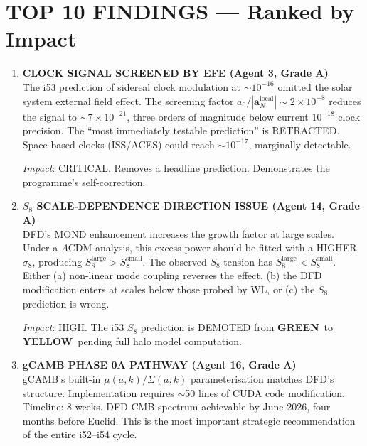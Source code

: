 \documentclass[11pt,a4paper]{article}
\newcommand{\GREEN}{\textcolor{dfdgreen}{\textbf{GREEN}}}
\newcommand{\YELLOW}{\textcolor{dfdyellow}{\textbf{YELLOW}}}
\begin{document}
\section{TOP 10 FINDINGS --- Ranked by Impact}
\label{sec:top10}

\begin{enumerate}[label=\textbf{\arabic*.}, leftmargin=1.5cm]

\item \textbf{CLOCK SIGNAL SCREENED BY EFE (Agent 3, Grade A)}\\
The i53 prediction of sidereal clock modulation at $\sim 10^{-16}$ omitted the solar system external field effect. The screening factor $a_0/|\mathbf{a}_N^{\mathrm{local}}| \sim 2 \times 10^{-8}$ reduces the signal to $\sim 7 \times 10^{-21}$, three orders of magnitude below current $10^{-18}$ clock precision. The ``most immediately testable prediction'' is RETRACTED. Space-based clocks (ISS/ACES) could reach $\sim 10^{-17}$, marginally detectable.

\textit{Impact}: CRITICAL. Removes a headline prediction. Demonstrates the programme's self-correction.

\item \textbf{$S_8$ SCALE-DEPENDENCE DIRECTION ISSUE (Agent 14, Grade A)}\\
DFD's MOND enhancement increases the growth factor at large scales. Under a $\Lambda$CDM analysis, this excess power should be fitted with a HIGHER $\sigma_8$, producing $S_8^{\mathrm{large}} > S_8^{\mathrm{small}}$. The observed $S_8$ tension has $S_8^{\mathrm{large}} < S_8^{\mathrm{small}}$. Either (a) non-linear mode coupling reverses the effect, (b) the DFD modification enters at scales below those probed by WL, or (c) the $S_8$ prediction is wrong.

\textit{Impact}: HIGH. The i53 $S_8$ prediction is DEMOTED from \GREEN\ to \YELLOW\ pending full halo model computation.

\item \textbf{gCAMB PHASE 0A PATHWAY (Agent 16, Grade A)}\\
gCAMB's built-in $\mu(a,k)/\Sigma(a,k)$ parameterisation matches DFD's structure. Implementation requires $\sim$50 lines of CUDA code modification. Timeline: 8 weeks. DFD CMB spectrum achievable by June 2026, four months before Euclid. This is the most important strategic recommendation of the entire i52--i54 cycle.


\end{enumerate}
\end{document}
